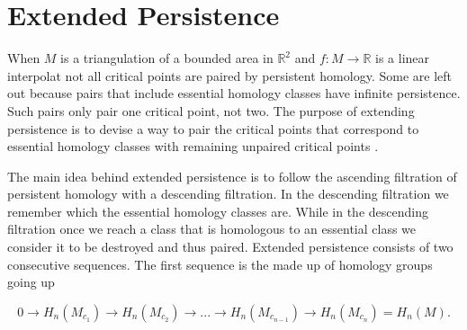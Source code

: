 \section{Extended Persistence}



%
%

%



When $M$ is a triangulation of a bounded area in $\mathbb{R}^2$ and $f: M \to \mathbb{R}$ is a linear interpolat not all critical points are paired by persistent homology. Some are left out because pairs that include essential homology classes have infinite persistence. Such pairs only pair one critical point, not two. The purpose of extending persistence is to devise a way to pair the critical points that correspond to essential homology classes with remaining unpaired critical points \cite{persistence-extended}.

The main idea behind extended persistence is to follow the ascending filtration of persistent homology with a descending filtration. In the descending filtration we remember which the essential homology classes are. While in the descending filtration once we reach a class that is homologous to an essential class we consider it to be destroyed and thus paired. Extended persistence consists of two consecutive sequences. The first sequence is the made up of homology groups going up

$$ 0 \rightarrow H_n(M_{c_1}) \rightarrow H_n(M_{c_2}) \rightarrow ... \rightarrow H_n(M_{c_{n-1}}) \rightarrow H_n(M_{c_n}) =  H_n(M) .$$

